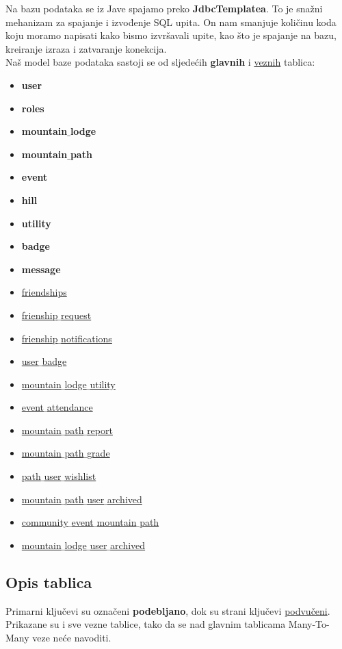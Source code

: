 		Na bazu podataka se iz Jave spajamo preko \textbf{JdbcTemplatea}. To je snažni mehanizam za spajanje i izvođenje SQL upita. On nam smanjuje količinu koda koju moramo napisati kako bismo izvršavali upite, kao što je spajanje na bazu, kreiranje izraza i zatvaranje konekcija. \\
		\newpage
	Naš model baze podataka sastoji se od sljedećih \textbf{glavnih} i \underline{veznih} tablica:
		\begin{itemize}[noitemsep]
		\item \textbf{user}
\item \textbf{roles}
\item \textbf{mountain$\_$lodge}
\item \textbf{mountain$\_$path}
\item \textbf{event}
\item \textbf{hill}
\item \textbf{utility}
\item \textbf{badge}
\item \textbf{message}
\item \underline{friendships}
\item \underline{frienship$\_$request}
\item \underline{frienship$\_$notifications}
\item \underline{user$\_$badge}
\item \underline{mountain$\_$lodge$\_$utility}

\item \underline{event$\_$attendance}
\item \underline{mountain$\_$path$\_$report}
\item \underline{mountain$\_$path$\_$grade}
\item \underline{path$\_$user$\_$wishlist}
\item \underline{mountain$\_$path$\_$user$\_$archived}
\item
\underline{community$\_$event$\_$mountain$\_$path}
\item
\underline{mountain$\_$lodge$\_$user$\_$archived}

\end{itemize}
\newpage
\subsection{Opis tablica}
Primarni ključevi su označeni \textbf{podebljano}, dok su strani ključevi \underline{podvučeni}. \\
Prikazane su i sve vezne tablice, tako da se nad glavnim tablicama Many-To-Many veze neće navoditi.

